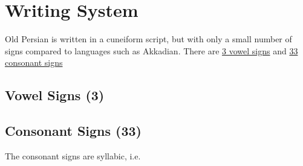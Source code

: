 \section{Writing System}\cite{OmniglotOldPersian,SkjærvøPersian}

Old Persian is written in a cuneiform script, but with only a small number of signs compared to languages such as
Akkadian. There are \hyperref[Vowel Signs]{3 vowel signs} and \hyperref[Consonant Signs]{33 consonant signs}

\subsection{Vowel Signs (3)}
\label{Vowel Signs}

 \space\space\space\space\space
{} \space\space\space\space\space
{} \space\space\space\space\space

\subsection{Consonant Signs (33)}
\label{Consonant Signs}

The consonant signs are syllabic, i.e.

